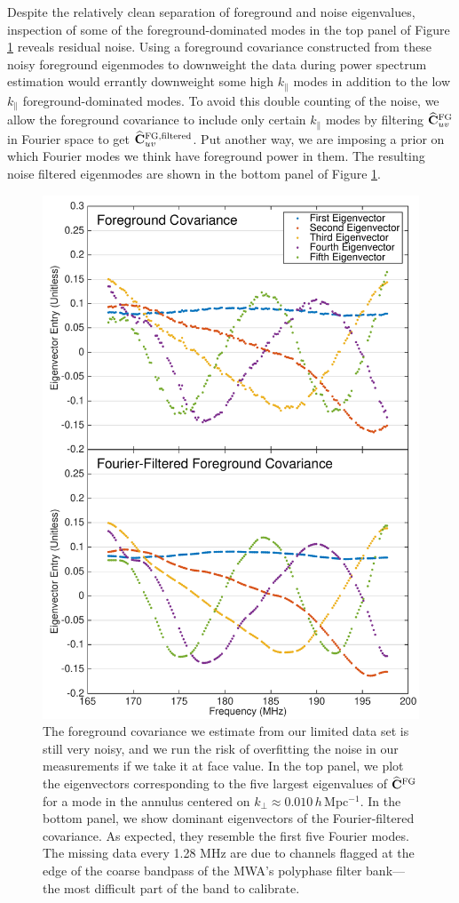 Despite the relatively clean separation of foreground and noise eigenvalues, inspection of some of the foreground-dominated modes in the top panel of Figure \ref{fig:eigenvectors} reveals residual noise. Using a foreground covariance constructed from these noisy foreground eigenmodes to downweight the data during power spectrum estimation would errantly downweight some high $k_\|$ modes in addition to the low $k_\|$ foreground-dominated modes. To avoid this double counting of the noise, we allow the foreground covariance to include only certain $k_\|$ modes by filtering $\widehat{\mathbf{C}}^\text{FG}_{uv}$ in Fourier space to get $\widehat{\mathbf{C}}^\text{FG,filtered}_{uv}$. Put another way, we are imposing a prior on which Fourier modes we think have foreground power in them. The resulting noise filtered eigenmodes are shown in the bottom panel of Figure \ref{fig:eigenvectors}.

\begin{figure}[] 
	\centering 
	\includegraphics[width=.48\textwidth]{chap4_empirical_covariance/eigenvectors.pdf} 
	\caption[Results of fourier filtering the eigenmodes.]{The foreground covariance we estimate from our limited data set is still very noisy, and we run the risk of overfitting the noise in our measurements if we take it at face value. In the top panel, we plot the eigenvectors corresponding to the five largest eigenvalues of $\widehat{\mathbf{C}}^\text{FG}$ for a mode in the annulus centered on $k_\perp \approx 0.010$\,$h$\,Mpc$^{-1}$.  In the bottom panel, we show dominant eigenvectors of the Fourier-filtered covariance. As expected, they resemble the first five Fourier modes. The missing data every 1.28 MHz are due to channels flagged at the edge of the coarse bandpass of the MWA's polyphase filter bank---the most difficult part of the band to calibrate.} 
	\label{fig:eigenvectors}
\end{figure}   

